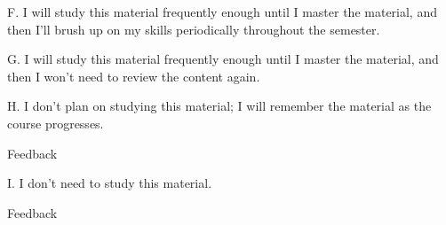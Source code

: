 \documentclass{ximera}
\begin{document}
\begin{question}
\begin{question}
\end{question}
\begin{question}
    
    F. I will study this material frequently enough until I master the material, and then I'll brush up on my skills periodically throughout the semester. 

    \begin{multipleChoice}
    \end{multipleChoice}
    
\end{question}
\begin{question}
    
    G. I will study this material frequently enough until I master the material, and then I won't need to review the content again. 

    \begin{multipleChoice}
    \end{multipleChoice}
    
\end{question}
\begin{question}
    
    H. I don't plan on studying this material; I will remember the material as the course progresses. 

    \begin{multipleChoice}
        
        \begin{feedback}[attempt]
        Feedback
        \end{feedback}
        
    \end{multipleChoice}
    
\end{question}
\begin{question}
    
    I. I don't need to study this material. 

    \begin{multipleChoice}
        
        \begin{feedback}[attempt]
        Feedback
        \end{feedback}
        
    \end{multipleChoice}
    
\end{question}

\end{question}




%
\end{document}
